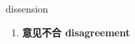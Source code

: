 
\begin{frame}
{\huge dissension}
\begin{center}
\begin{enumerate}\Large
  \item \textbf{意见不合 disagreement}
\end{enumerate}
\end{center}
\end{frame}
